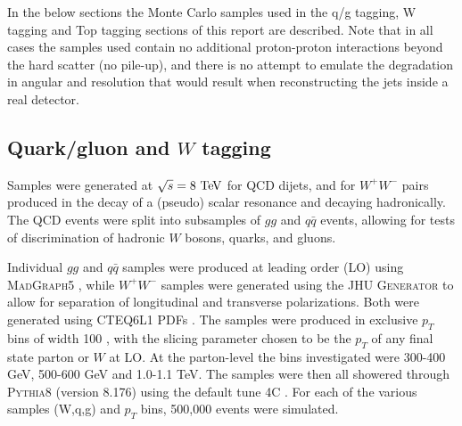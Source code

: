 In the below sections the Monte Carlo samples used in the q/g tagging,
W tagging and Top tagging sections of this report are described. Note
that in all cases the samples used contain no additional proton-proton
interactions beyond the hard scatter (no pile-up), and there is no
attempt to emulate the degradation in angular and \pt resolution that
would result when reconstructing the jets inside a real detector.


\subsection{Quark/gluon and $W$ tagging}

Samples were generated at $\sqrt{s} = 8\TeV$ for QCD dijets, and for $W^+W^-$
pairs produced in the decay of a (pseudo) scalar resonance and
decaying hadronically. The QCD events
were split into subsamples of $gg$ and $q\bar{q}$ events, allowing for tests of
discrimination of hadronic $W$ bosons, quarks, and gluons.

Individual $gg$ and $q\bar{q}$ samples were produced at leading order (LO)
using \textsc{MadGraph5} \cite{Alwall:2011uj}, while $W^+W^-$ samples were generated using
the \textsc{JHU Generator} \cite{Gao:2010qx,Bolognesi:2012mm,Anderson:2013afp} to allow for separation of longitudinal and
transverse polarizations. Both were generated using \textsc{CTEQ6L1}
PDFs \cite{Pumplin:2002vw}. The samples were produced in exclusive $p_T$ bins
of width 100 {\GeV}, with the slicing parameter
chosen to be the $p_T$ of any final state parton or $W$ at LO. At the
parton-level the \pt bins investigated were 300-400 GeV, 500-600 GeV
and 1.0-1.1 TeV. 
The samples were
then all showered through \textsc{Pythia8} (version 8.176) \cite{Sjostrand:2007gs} using the default tune 4C \cite{Buckley:2011ms}.
For each of the various samples (W,q,g) and $p_T$ bins, 500,000 events were simulated.





